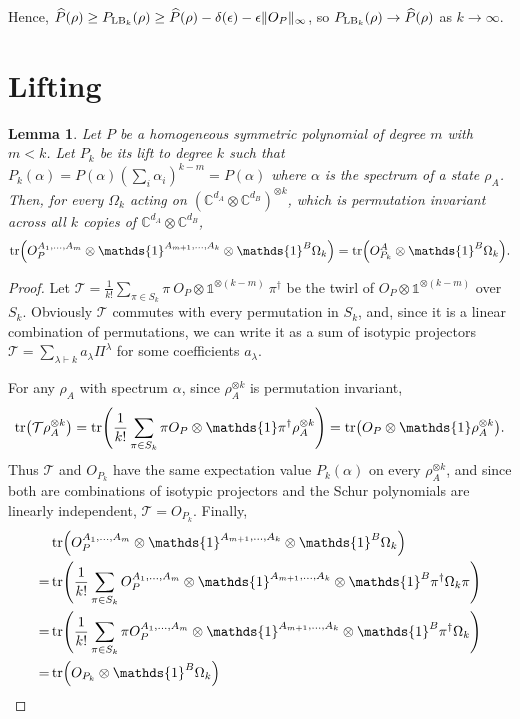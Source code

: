 \documentclass[aps,pra,twocolumn,showpacs,superscriptaddress,groupedaddress]{revtex4-2}
\newcommand{\one}[0]{\mathds{1}}
\renewcommand{\a}{\alpha}
\newcommand{\C}{\mathds{C}}
\newcommand{\I}{\one}
\newtheorem{lemma}      [theorem]{Lemma}
\begin{document}
\begin{widetext}
Hence, $\widehat{P}{(\rho)} \geq P_{{\rm LB}_k}(\rho) \geq \widehat{P}{(\rho)} -\delta(\epsilon) - \epsilon\|O_P\|_\infty$, so $P_{{\rm LB}_k}(\rho) \to \widehat{P}(\rho)$ as $k \to \infty$.

\section{Lifting}
\begin{lemma}\label{lem:lifting}
    Let $P$ be a homogeneous symmetric polynomial of degree $m$ with $m < k$. Let $P_k$ be its lift to degree $k$ such that $P_k(\a) = P(\a) \left(\sum_i \a_i \right)^{k-m} = P(\a)$ where $\a$ is the spectrum of a state $\rho_A$.
    Then, for every $\Omega_k$ acting on $(\C^{d_A} \otimes \C^{d_B})^{\otimes k}$, which is permutation invariant across all $k$ copies of $\C^{d_A} \otimes \C^{d_B}$,
    \begin{equation}
        \tr(O_P^{A_1,\dots, A_m} \otimes \I^{A_{m+1}, \dots, A_k} \otimes \I^{B} \Omega_k) = \tr(O_{P_k}^A \otimes \I^B \Omega_k).
    \end{equation}
\end{lemma}
\begin{proof}
    Let $\mathcal{T} = \frac{1}{k!}\sum_{\pi \in S_k} \pi \ O_P \otimes \I^{\otimes (k-m)} \ \pi^\dagger$ be the twirl of $O_P \otimes \I^{\otimes (k-m)}$ over $S_k$. Obviously $\mathcal{T}$ commutes with every permutation in $S_k$, and, since it is a linear combination of permutations, we can write it as a sum of isotypic projectors $\mathcal{T} = \sum_{\lambda \vdash k} a_\lambda \Pi^\lambda$ for some coefficients $a_\lambda$.

    For any $\rho_A$ with spectrum $\a$, since $\rho_A^{\otimes k}$ is permutation invariant,
    \begin{equation}
        \tr(\mathcal{T}\rho_A^{\otimes k}) = \tr(\frac{1}{k!} \sum_{\pi \in S_k} \pi O_P \otimes \I \pi^\dagger \rho_A^{\otimes k})= \tr(O_P \otimes \I \rho_A^{\otimes k}).
    \end{equation}
    Thus $\mathcal{T}$ and $O_{P_k}$ have the same expectation value $P_k(\a)$ on every $\rho_A^{\otimes k}$, and since both are combinations of isotypic projectors and the Schur polynomials are linearly independent, $\mathcal{T} = O_{P_k}$.
    Finally,
    \begin{align}
        &\tr(O_P^{A_1,\dots, A_m} \otimes \I^{A_{m+1}, \dots, A_k} \otimes \I^{B} \Omega_k)\\
        =& \tr( \frac{1}{k!}\sum_{\pi \in S_k} O_P^{A_1,\dots, A_m} \otimes \I^{A_{m+1}, \dots, A_k} \otimes \I^{B} \pi^\dagger \Omega_k \pi)\\
        =& \tr( \frac{1}{k!}\sum_{\pi \in S_k}  \pi O_P^{A_1,\dots, A_m} \otimes \I^{A_{m+1}, \dots, A_k} \otimes \I^{B} \pi^\dagger \Omega_k)\\
        =& \tr( O_{P_k} \otimes \I^{B} \Omega_k)
    \end{align}
\end{proof}


\end{widetext}
\end{document}
